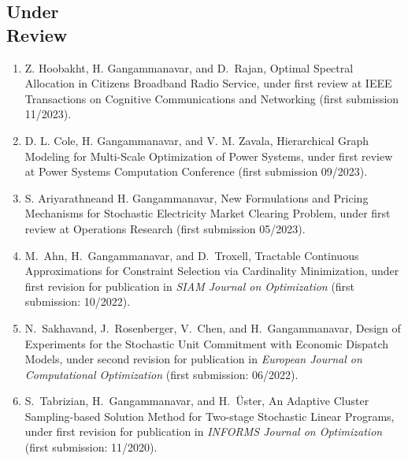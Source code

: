 \documentclass[hyperref, margin]{myResume}
\newif\ifpublic
\begin{document}
\begin{resume}
\section{Under\\Review}
\begin{enumerate}[label=R\arabic*., leftmargin=*] 
	\item Z. Hoobakht, H. Gangammanavar, and D.\ Rajan, Optimal Spectral Allocation in Citizens Broadband Radio Service, \ifpublic 2023 (first review). \else under first review at IEEE Transactions on Cognitive Communications and Networking (first submission 11/2023).\fi
	\item D. L. Cole, H. Gangammanavar, and V. M. Zavala, Hierarchical Graph Modeling for Multi-Scale Optimization of Power Systems, \ifpublic 2023 (first review). \else under first review at Power Systems Computation Conference (first submission 09/2023).\fi
	\item S. Ariyarathne\footnotemark[1] and H. Gangammanavar, New Formulations and Pricing Mechanisms for Stochastic Electricity Market Clearing Problem, \ifpublic 2023 (first review). \else under first review at Operations Research (first submission 05/2023).\fi
	\item M.\ Ahn, H.\ Gangammanavar, and D.\ Troxell\footnotemark[3], Tractable Continuous Approximations for Constraint Selection via Cardinality Minimization, \ifpublic 2022 (under second review). \else under first revision for publication in \textit{SIAM Journal on Optimization} (first submission: 10/2022).\fi
	\item N.\ Sakhavand\footnotemark[3], J.\ Rosenberger, V.\ Chen, and H.\ Gangammanavar, Design of Experiments for the Stochastic Unit Commitment with Economic Dispatch Models, \ifpublic 2022 (under second revision). \else under second revision for publication in \textit{European Journal on Computational Optimization} (first submission: 06/2022). \fi 
	\item S.\ Tabrizian\footnotemark[1], H.\ Gangammanavar, and H.\ \"{U}ster, An Adaptive Cluster Sampling-based Solution Method for Two-stage Stochastic Linear Programs, \ifpublic 2020. \else under first revision for publication in \textit{INFORMS Journal on Optimization} (first submission: 11/2020). \fi
\end{enumerate}


\end{resume}
\end{document}
